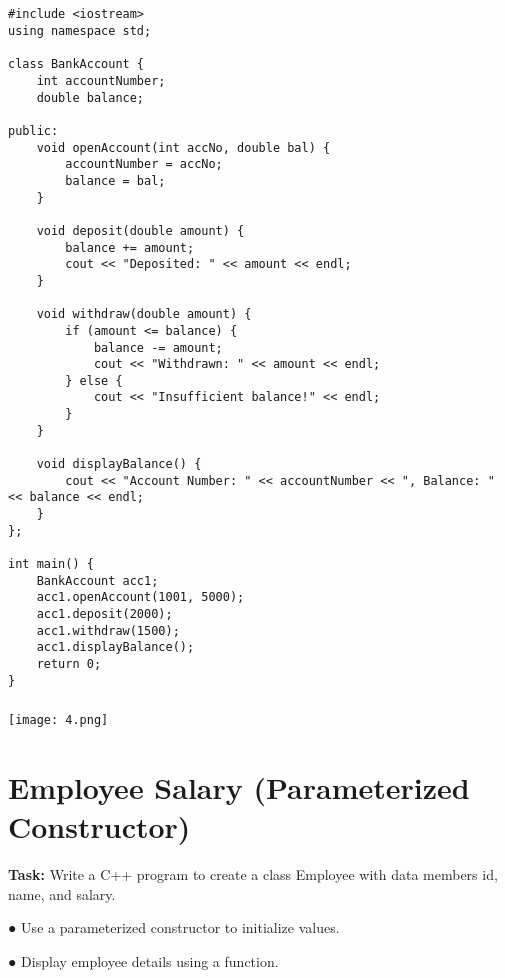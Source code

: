\documentclass[12pt,a4paper]{article}
\begin{document}
\subsection{}
\begin{lstlisting}
#include <iostream>
using namespace std;

class BankAccount {
    int accountNumber;
    double balance;

public:
    void openAccount(int accNo, double bal) {
        accountNumber = accNo;
        balance = bal;
    }

    void deposit(double amount) {
        balance += amount;
        cout << "Deposited: " << amount << endl;
    }

    void withdraw(double amount) {
        if (amount <= balance) {
            balance -= amount;
            cout << "Withdrawn: " << amount << endl;
        } else {
            cout << "Insufficient balance!" << endl;
        }
    }

    void displayBalance() {
        cout << "Account Number: " << accountNumber << ", Balance: " << balance << endl;
    }
};

int main() {
    BankAccount acc1;
    acc1.openAccount(1001, 5000);
    acc1.deposit(2000);
    acc1.withdraw(1500);
    acc1.displayBalance();
    return 0;
}
\end{lstlisting}

\subsubsection{}
\begin{center}
    \texttt{[image: 4.png]}
\end{center}


\section{Employee Salary (Parameterized Constructor) }
\textbf{Task:} Write a C++ program to create a class Employee with data members id, name, and salary.
    \item ● Use a parameterized constructor to initialize values.
    \item ● Display employee details using a function.
\end{document}
